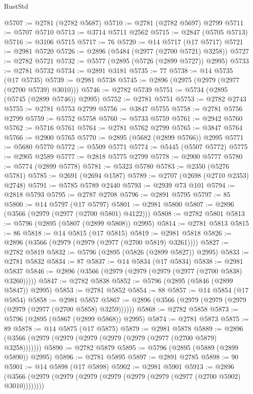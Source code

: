 \begin{lexlean}{RustStd}
\begin{coremodule}
@5707 := @2781 (@2782 @5687)
@5710 := @2781 (@2782 @5697) @2799
@5711 := @5707 @5710
@5713 := @3714 @5711 @2562
@5715 := @2847 (@5705 @5713)
@5716 := @3106 @5715
@5717 := 76
@5720 := @14 @5717 (@17 @5717)
@5721 := @2981 @5720
@5726 := @2896 (@5484 (@2977 (@2700 @5721) @3258))
@5727 := @2782 @5721
@5732 := @5577 (@2895 (@5726 (@2899 @5727)) @2995)
@5733 := @2781 @5732
@5734 := @2891 @3181
@5735 := 77
@5738 := @14 @5735 (@17 @5735)
@5739 := @2981 @5738
@5745 := @2896 (@2975 (@2979 (@2977 (@2700 @5739) @3010)))
@5746 := @2782 @5739
@5751 := @5734 (@2895 (@5745 (@2899 @5746)) @2995)
@5752 := @2781 @5751
@5753 := @2782 @2743
@5755 := @2781 @5753 @2799
@5756 := @3847 @5755
@5758 := @2781 @5756 @2799
@5759 := @5752 @5758
@5760 := @5733 @5759
@5761 := @2942 @5760
@5762 := @5716 @5761
@5764 := @2781 @5762 @2799
@5765 := @3847 @5764
@5766 := @2900 @5765
@5770 := @2895 (@5682 (@2899 @5766)) @2995
@5771 := @5680 @5770
@5772 := @5509 @5771
@5774 := @5445 (@5507 @5772)
@5775 := @2905 @2589
@5777 := @2818 @5775 @2799
@5778 := @2900 @5777
@5780 := @5774 (@2899 @5778)
@5781 := @5323 @5780
@5783 := @2350 (@5276 @5781)
@5785 := @2691 (@2694 @1587)
@5789 := @2707 (@2698 (@2710 @2353) @2748)
@5791 := @5785 @5789 @2440
@5793 := @2939 @73 @101
@5794 := @2818 @5793
@5795 := @2787 @2708
@5796 := @2891 @5795
@5797 := 85
@5800 := @14 @5797 (@17 @5797)
@5801 := @2981 @5800
@5807 := @2896 (@3566 (@2979 (@2977 (@2700 @5801) @4122)))
@5808 := @2782 @5801
@5813 := @5796 (@2895 (@5807 (@2899 @5808)) @2995)
@5814 := @2781 @5813
@5815 := 86
@5818 := @14 @5815 (@17 @5815)
@5819 := @2981 @5818
@5826 := @2896 (@3566 (@2979 (@2979 (@2977 (@2700 @5819) @3261))))
@5827 := @2782 @5819
@5832 := @5796 (@2895 (@5826 (@2899 @5827)) @2995)
@5833 := @2781 @5832
@5834 := 87
@5837 := @14 @5834 (@17 @5834)
@5838 := @2981 @5837
@5846 := @2896 (@3566 (@2979 (@2979 (@2979 (@2977 (@2700 @5838) @3260)))))
@5847 := @2782 @5838
@5852 := @5796 (@2895 (@5846 (@2899 @5847)) @2995)
@5853 := @2781 @5852
@5854 := 88
@5857 := @14 @5854 (@17 @5854)
@5858 := @2981 @5857
@5867 := @2896 (@3566 (@2979 (@2979 (@2979 (@2979 (@2977 (@2700 @5858) @3259))))))
@5868 := @2782 @5858
@5873 := @5796 (@2895 (@5867 (@2899 @5868)) @2995)
@5874 := @2781 @5873
@5875 := 89
@5878 := @14 @5875 (@17 @5875)
@5879 := @2981 @5878
@5889 := @2896 (@3566 (@2979 (@2979 (@2979 (@2979 (@2979 (@2977 (@2700 @5879) @3258)))))))
@5890 := @2782 @5879
@5895 := @5796 (@2895 (@5889 (@2899 @5890)) @2995)
@5896 := @2781 @5895
@5897 := @2891 @2785
@5898 := 90
@5901 := @14 @5898 (@17 @5898)
@5902 := @2981 @5901
@5913 := @2896 (@3566 (@2979 (@2979 (@2979 (@2979 (@2979 (@2979 (@2977 (@2700 @5902) @3010))))))))

\end{coremodule}
\end{lexlean}
